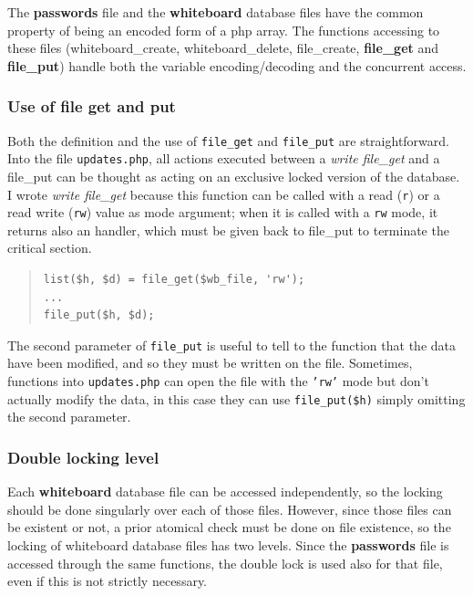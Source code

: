 \documentclass[10pt,a4paper,english]{book}
\begin{document}
The \textbf{passwords} file and the \textbf{whiteboard} database files have the
common property of being an encoded form of a php array. The functions
accessing to these files (whiteboard{\_}create, whiteboard{\_}delete,
file{\_}create, \textbf{file{\_}get} and \textbf{file{\_}put}) handle both the variable
encoding/decoding and the concurrent access.



\hypertarget{use-of-file-get-and-put}{}
\subsubsection{Use of file get and put}
\label{use-of-file-get-and-put}

Both the definition and the use of \texttt{file{\_}get} and \texttt{file{\_}put} are
straightforward\footnotemark[4]. Into the file \texttt{updates.php}, all
actions executed between a \emph{write file{\_}get} and a file{\_}put can be
thought as acting on an exclusive locked version of the database. I
wrote \emph{write file{\_}get} because this function can be called with a read
(\texttt{r}) or a read write (\texttt{rw}) value as mode argument; when it is
called with a \texttt{rw} mode, it returns also an handler, which must be
given back to file{\_}put to terminate the critical section.
\begin{quote}\begin{verbatim}
list($h, $d) = file_get($wb_file, 'rw');
...
file_put($h, $d);
\end{verbatim}
\end{quote}

The second parameter of \texttt{file{\_}put} is useful to tell to the function
that the data have been modified, and so they must be written on the
file. Sometimes, functions into \texttt{updates.php} can open the file with
the \texttt{'rw'} mode but don't actually modify the data, in this case
they can use \texttt{file{\_}put({\$}h)} simply omitting the second parameter.



\hypertarget{double-locking-level}{}
\subsubsection{Double locking level}
\label{double-locking-level}

Each \textbf{whiteboard} database file can be accessed independently, so
the locking should be done singularly over each of those
files. However, since those files can be existent or not, a prior
atomical check must be done on file existence, so the locking of
whiteboard database files has two levels. Since the \textbf{passwords} file
is accessed through the same functions, the double lock is used also
for that file, even if this is not strictly necessary.
\end{document}
